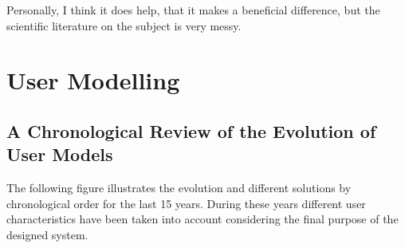 

\begin{savequote}[50mm]
Personally, I think it does help, that it makes a beneficial difference, but the scientific literature on the subject is very messy.
%
\end{savequote}


\section{User Modelling}
\label{sec:user}

\ifpdf
    \graphicspath{{2_state_of_the_art/figures/PNG/}{2_state_of_the_art/figures/PDF/}{2_state_of_the_art/figures/}}
\else
    \graphicspath{{2_state_of_the_art/figures/EPS/}{2_state_of_the_art/figures/}}
\fi



\subsection{A Chronological Review of the Evolution of User Models}
\label{sec:chronological_review}

The following figure illustrates the evolution and different solutions by 
chronological order for the last 15 years. During these years different user
characteristics have been taken into account considering the final purpose of
the designed system. 

\vspace{1cm}
\setlength\taskwidth{1.7cm}

\begin{timeline}
  \label{chr:users}
\end{timeline}


